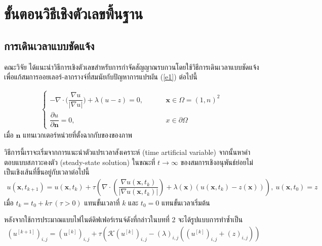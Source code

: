 \section{ขั้นตอนวิธีเชิงตัวเลขพื้นฐาน}

\subsection{การเดินเวลาแบบชัดแจ้ง}

\hspace{1cm} คณะวิจัย \cite{ref:ROF-template} ได้แนะนำวิธีการเชิงตัวเลขสำหรับการกำจัดสัญญาณรบกวนโดยใช้วิธีการเดินเวลาแบบชัดแจ้ง เพื่อแก้สมการออยเลอร์-ลากรางจ์ที่สมนัยกับปัญหาการแปรผัน (\ref{e1}) ต่อไปนี้

\begin{align}
\left \{ \begin{array}{ll}  - \nabla \cdot  \Big( \dfrac{\nabla u}{|\nabla u|} \Big) + \lambda (u-z) = 0,  & \hspace{1cm} \mathbf{x} \in \Omega = (1,n)^2 \\ \dfrac{\partial u}{\partial \boldsymbol{n}} = 0, & \hspace{1cm} x \in \partial \Omega \end{array} \right . 
\label{e3}
\end{align}
เมื่อ $\boldsymbol{n}$ แทนเวกเตอร์หน่วยที่ตั้งฉากกับของของภาพ

\hspace{1cm} วิธีการนี้เราจะเริ่มจากการแนะนําตัวแปรเวลาสังเคราะห์ (time artificial variable) จากนั้นหาคําตอบแบบสภาวะคงตัว (steady-state solution) ในขณะที่ $t\rightarrow \infty$ ของสมการเชิงอนุพันธ์ย่อยไม่เป็นเชิงเส้นที่ขึ้นอยู่กับเวลาต่อไปนี้ 
\begin{align}
	u(\mathbf{x},t_{k+1})=u(\mathbf{x},t_{k})+\tau\left(\nabla \cdot\left(\dfrac{\nabla u (\mathbf{x},t_k)}{| \nabla u (\mathbf{x},t_k) | }\right) + \lambda(\mathbf{x})(u (\mathbf{x},t_k)-z(\mathbf{x})) \right),\ u(\mathbf{x},t_0)=z
	\label{e4}
\end{align}
เมื่อ $t_k=t_0+k\tau\ (\tau>0)$  แทนขั้นเวลาที่ $k$ และ $t_0=0$ แทนขั้นเวลาเริ่มต้น

\hspace{1cm} หลังจากใช้การประมาณแบบไฟไนต์ดิฟเฟอร์เรนจ์ดังที่กล่าวในบทที่ 2 จะได้รูปแบบการทำซ้ำเป็น 
\begin{align}
	(u^{[k+1]})_{i,j} = (u^{[k]})_{i,j}+\tau\left(\mathcal{K}(u^{[k]})_{i,j} - (\lambda)_{i,j} \left( (u^{[k]})_{i,j}+(z)_{i,j} \right) \right)
\end{align}

